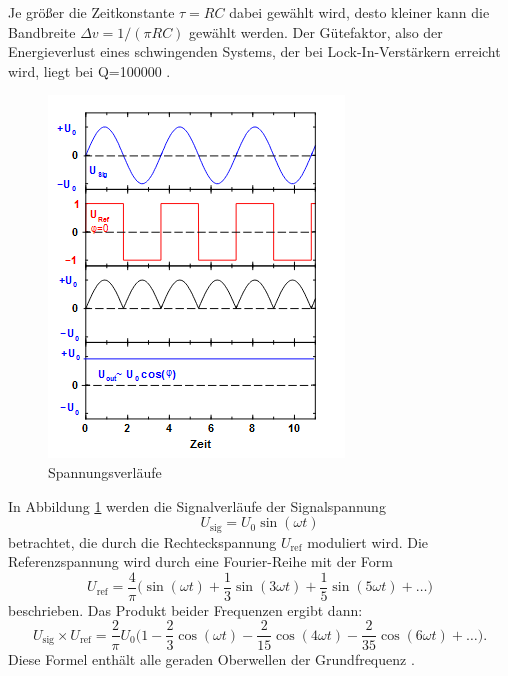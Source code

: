 Je größer die Zeitkonstante $\tau =RC$ dabei gewählt wird, desto kleiner kann die
Bandbreite $\Delta v=1/(\pi RC)$ gewählt werden.
Der Gütefaktor, also der Energieverlust eines schwingenden Systems,
der bei Lock-In-Verstärkern erreicht wird, liegt bei Q=100000
\cite{303}.
\newpage
\begin{figure}[h]
  \centering
  \includegraphics{Bilder/Spannung.jpg}
  \caption{Spannungsverläufe\,\cite{303}}
  \label{fig:spannung}
\end{figure}
In Abbildung \ref{fig:spannung} werden die Signalverläufe der Signalspannung
\begin{equation}
  U_\text{sig}=U_0\sin(\omega t)
\end{equation}
betrachtet, die durch die Rechteckspannung $U_\text{ref}$ moduliert wird.
Die Referenzspannung wird durch eine Fourier-Reihe mit der Form
\begin{equation}
  U_\text{ref}=\frac{4}{\pi}\biggl(\sin(\omega t)+\frac{1}{3}\sin(3\omega t)
  +\frac{1}{5}\sin(5\omega t)+\dots\biggr)
\end{equation}
beschrieben. Das Produkt beider Frequenzen ergibt dann:
\begin{equation}
  U_\text{sig}\times U_\text{ref} =\frac{2}{\pi}U_0\biggl(1-\frac{2}{3}\cos(\omega t)
  -\frac{2}{15}\cos(4\omega t)-\frac{2}{35}\cos(6\omega t)+\dots\biggr).
\end{equation}
Diese Formel enthält alle geraden Oberwellen der Grundfrequenz \omega.
